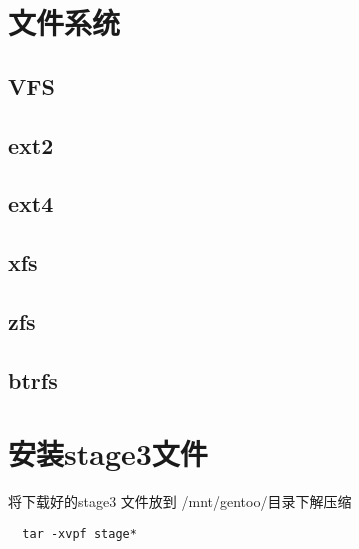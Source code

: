 \chapter{文件系统}
\section{VFS}
\section{ext2}
\section{ext4}
\section{xfs}
\section{zfs}
\section{btrfs}

\chapter{安装stage3文件}

将下载好的stage3 文件放到 /mnt/gentoo/目录下解压缩

\begin{lstlisting}
  tar -xvpf stage*
\end{lstlisting}

